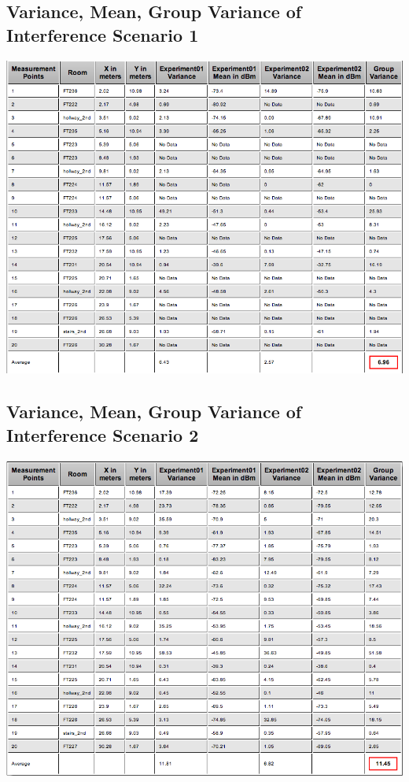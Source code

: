 \documentclass[11pt,a4paper,headinclude,footinclude,chapterprefix=on]{scrreprt}
\begin{document}
\subsection{Variance, Mean, Group Variance of Interference Scenario 1} 
\includegraphics[width=15cm]{../../Source/plot/data/63_int1.png} 
\subsection{Variance, Mean, Group Variance of Interference Scenario 2} 
\includegraphics[width=15cm]{../../Source/plot/data/63_int2.png} 

\pagebreak 
\end{document}
